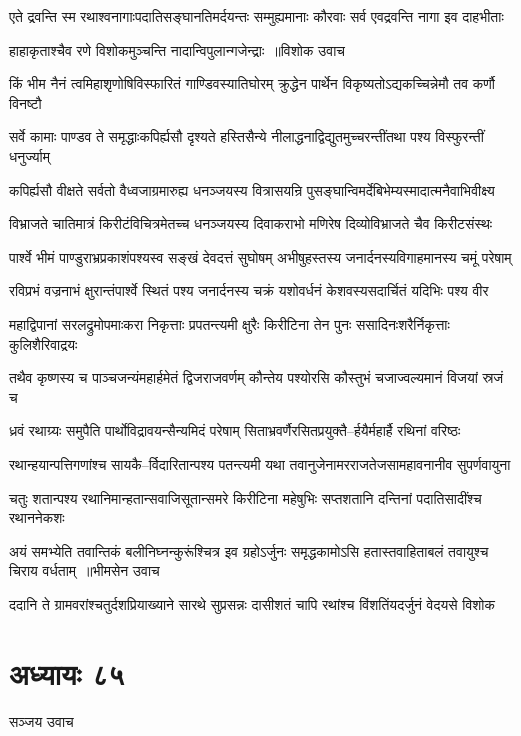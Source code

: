 \twolineshloka
{एते द्रवन्ति स्म रथाश्वनागाःपदातिसङ्घानतिमर्दयन्तः}
{सम्मुह्यमानाः कौरवाः सर्व एवद्रवन्ति नागा इव दाहभीताः}


\twolineshloka
{हाहाकृताश्चैव रणे विशोकमुञ्चन्ति नादान्विपुलान्गजेन्द्राः ॥विशोक उवाच}
{}


\twolineshloka
{किं भीम नैनं त्वमिहाशृणोषिविस्फारितं गाण्डिवस्यातिघोरम्}
{क्रुद्धेन पार्थेन विकृष्यतोऽद्यकच्चिन्नेमौ तव कर्णौ विनष्टौ}


\twolineshloka
{सर्वे कामाः पाण्डव ते समृद्धाःकपिर्ह्यसौ दृश्यते हस्तिसैन्ये}
{नीलाद्धनाद्विद्युतमुच्चरन्तींतथा पश्य विस्फुरन्तीं धनुर्ज्याम्}


\twolineshloka
{कपिर्ह्यसौ वीक्षते सर्वतो वैध्वजाग्रमारुह्य धनञ्जयस्य}
{वित्रासयन्रि पुसङ्घान्विमर्देबिभेम्यस्मादात्मनैवाभिवीक्ष्य}


\twolineshloka
{विभ्राजते चातिमात्रं किरीटंविचित्रमेतच्च धनञ्जयस्य}
{दिवाकराभो मणिरेष दिव्योविभ्राजते चैव किरीटसंस्थः}


\twolineshloka
{पार्श्वे भीमं पाण्डुराभ्रप्रकाशंपश्यस्व सङ्खं देवदत्तं सुघोषम्}
{अभीषुहस्तस्य जनार्दनस्यविगाहमानस्य चमूं परेषाम्}


\twolineshloka
{रविप्रभं वज्रनाभं क्षुरान्तंपार्श्वे स्थितं पश्य जनार्दनस्य}
{चक्रं यशोवर्धनं केशवस्यसदार्चितं यदिभिः पश्य वीर}


\twolineshloka
{महाद्विपानां सरलद्रुमोपमाःकरा निकृत्ताः प्रपतन्त्यमी क्षुरैः}
{किरीटिना तेन पुनः ससादिनःशरैर्निकृत्ताः कुलिशैरिवाद्रयः}


\twolineshloka
{तथैव कृष्णस्य च पाञ्चजन्यंमहार्हमेतं द्विजराजवर्णम्}
{कौन्तेय पश्योरसि कौस्तुभं चजाज्वल्यमानं विजयां स्रजं च}


\twolineshloka
{ध्रवं रथाग्र्यः समुपैति पार्थोविद्रावयन्सैन्यमिदं परेषाम्}
{सिताभ्रवर्णैरसितप्रयुक्तै--र्हयैर्महार्है रथिनां वरिष्ठः}


\twolineshloka
{रथान्हयान्पत्तिगणांश्च सायकै--र्विदारितान्पश्य पतन्त्यमी यथा}
{तवानुजेनामरराजतेजसामहावनानीव सुपर्णवायुना}


\twolineshloka
{चतुः शतान्पश्य रथानिमान्हतान्सवाजिसूतान्समरे किरीटिना}
{महेषुभिः सप्तशतानि दन्तिनां पदातिसादींश्च रथाननेकशः}


\threelineshloka
{अयं समभ्येति तवान्तिकं बलीनिघ्नन्कुरूंश्चित्र इव ग्रहोऽर्जुनः}
{समृद्धकामोऽसि हतास्तवाहिताबलं तवायुश्च चिराय वर्धताम् ॥भीमसेन उवाच}
{}


\twolineshloka
{ददानि ते ग्रामवरांश्चतुर्दशप्रियाख्याने सारथे सुप्रसन्नः}
{दासीशतं चापि रथांश्च विंशतिंयदर्जुनं वेदयसे विशोक}


\chapter{अध्यायः ८५}
\twolineshloka
{सञ्जय उवाच}
{}


